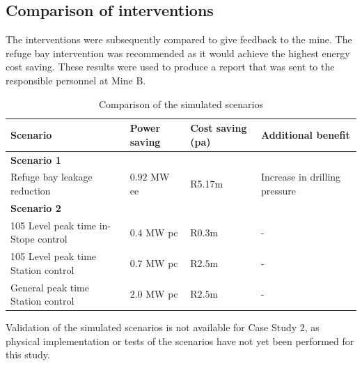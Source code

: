	\subsection{Comparison of interventions}
	The interventions were subsequently compared to give feedback to the mine. The refuge bay intervention was recommended as it would achieve the highest energy cost saving. These results were used to produce a report that was sent to the responsible personnel at Mine B.
	\\
	\begin{table}[h!]
		\caption{Comparison of the simulated scenarios}
		\centering
		\begin{tabular}{p{}
				p{}
				p{}
				p{}}
			\hline 
			 \vspace{0.5em}Scenario & \vspace{0.5em}Power saving & \vspace{0.5em}Cost saving (\gls{pa}) & \vspace{0.5em}Additional benefit \\
			\hline
			\multicolumn{4}{l}{\textbf{Scenario 1}} \\
			Refuge bay leakage reduction & $ 0.92 $ MW \gls{ee} & R5.17m & Increase in drilling pressure \\
			 
			\multicolumn{4}{l}{\textbf{Scenario 2}} \\
			105 Level peak time in-Stope control & $ 0.4 $ MW \gls{pc} & R$ 0.3 $m& - \\
			105 Level peak time Station control & $ 0.7 $ MW \gls{pc} & R$ 2.5 $m& - \\
			General peak time Station control & $ 2.0 $ MW \gls{pc} & R$ 2.5 $m& - \\
			\hline 
		\end{tabular}
		\label{Table: B Comparison}
	\end{table}
\par
Validation of the simulated scenarios is not available for Case Study 2, as physical implementation or tests of the scenarios have not yet been performed for this study.
